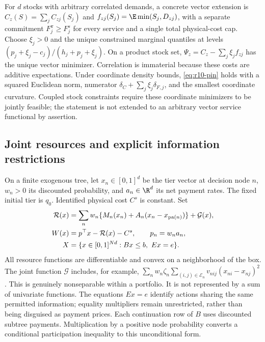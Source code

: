 For $d$ stocks with arbitrary correlated demands, a concrete vector extension is $C_z(S)=\sum_j C_{zj}(S_j)$ and $f_{zj}(S_j)=\E\min(S_j,D_{zj})$, with a separate commitment $F_j^\pi\geq F_j^s$ for every service and a single total physical-cost cap. Choose $\xi_j>0$ and the unique constrained marginal quantiles at levels $(p_j+\xi_j-c_j)/(h_j+p_j+\xi_j)$. On a product stock set, $\Psi_z=C_z-\sum_j\xi_j f_{zj}$ has the unique vector minimizer. Correlation is immaterial because these costs are additive expectations. Under coordinate density bounds, \eqref{eq:r10-pin} holds with a squared Euclidean norm, numerator $\delta_C+\sum_j\xi_j\delta_{F,j}$, and the smallest coordinate curvature. Coupled stock constraints require these coordinate minimizers to be jointly feasible; the statement is not extended to an arbitrary vector service functional by assertion.

\subsection{Joint resources and explicit information restrictions}
On a finite exogenous tree, let $x_n\in[0,1]^d$ be the tier vector at decision node $n$, $w_n>0$ its discounted probability, and $a_n\in\R^d$ its net payment rates. The fixed initial tier is $q_0$. Identified physical cost $C^s$ is constant. Set
\begin{align}
 \mathcal R(x)&=\sum_n w_n\{M_n(x_n)+A_n(x_n-x_{\mathrm{pa}(n)})\}+\mathcal G(x),\label{eq:r10-resource}\\
 W(x)&=p^\top x-\mathcal R(x)-C^s,\qquad p_n=w_na_n,\notag\\
 X&=\{x\in[0,1]^{Nd}: Bx\leq b,\ Ex=e\}.\label{eq:r10-poly}
\end{align}
All resource functions are differentiable and convex on a neighborhood of the box. The joint function $\mathcal G$ includes, for example, $\sum_n w_n\zeta_n\sum_{(i,j)\in\mathcal E_n}v_{nij}(x_{ni}-x_{nj})^2$. This is genuinely nonseparable within a portfolio. It is not represented by a sum of univariate functions. The equations $Ex=e$ identify actions sharing the same permitted information; equality multipliers remain unrestricted, rather than being disguised as payment prices. Each continuation row of $B$ uses discounted subtree payments. Multiplication by a positive node probability converts a conditional participation inequality to this unconditional form.

